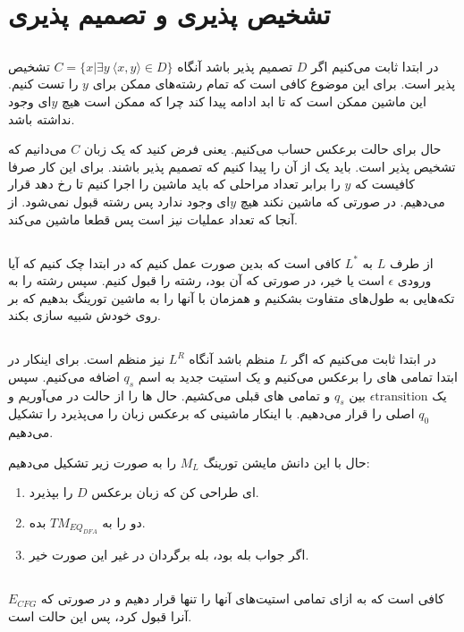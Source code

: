 \section{تشخيص پذيری و تصميم پذيری}
\subsection{}
در ابتدا ثابت می‌کنیم اگر
$D$
تصمیم پذیر باشد آنگاه
$C = \{x | \exists y ~ \langle x, y \rangle \in D\}$
تشخیص پذیر است. برای این موضوع کافی است که تمام رشته‌های ممکن برای
$y$
را تست کنیم. این ماشین ممکن است که تا ابد ادامه پیدا کند چرا که ممکن است هیچ
$y$ای وجود نداشته باشد.

حال برای حالت برعکس حساب می‌کنیم. یعنی فرض کنید که یک زبان
$C$
می‌دانیم که تشخیص پذیر است. باید یک
از آن را پیدا کنیم که تصمیم پذیر باشند. برای این کار صرفا کافیست که
$y$
را برابر تعداد مراحلی که باید ماشین را اجرا کنیم تا
رخ دهد قرار می‌دهیم. در صورتی که ماشین
نکند هیچ
$y$ای
وجود ندارد پس رشته قبول نمی‌شود. از آنجا که تعداد عملیات نیز
است پس قطعا ماشین
می‌کند.

\subsection{}
از طرف
$L$
به
$L^*$
کافی است که بدین صورت عمل کنیم که در ابتدا چک کنیم که آیا ورودی
$\epsilon$
است یا خیر، در صورتی که آن بود، رشته را قبول کنیم. سپس رشته را به تکه‌هایی به طول‌‌های متفاوت بشکنیم
و همزمان با
آنها را به ماشین تورینگ بدهیم که بر روی خودش شبیه سازی بکند.

\subsection{}
در ابتدا ثابت می‌کنیم که اگر
$L$
منظم باشد آنگاه
$L^R$
نیز منظم است. برای اینکار در ابتدا تمامی
های
را برعکس می‌کنیم و یک استیت جدید به اسم
$q_s$
اضافه می‌کنیم. سپس یک
$\epsilon \text{transition}$
بین
$q_s$
و تمامی
های
قبلی می‌کشیم. حال
ها
را از حالت
در می‌آوریم و
$q_0$
اصلی را
قرار می‌دهیم. با اینکار
ماشینی که برعکس زبان را می‌پذیرد را تشکیل می‌دهیم.

حال با این دانش مایشن تورینگ
$M_L$
را به صورت زیر تشکیل می‌دهیم:
\begin{enumerate}
    \item {}ای
    طراحی کن که زبان برعکس
    $D$
    را بپذیرد.
    \item دو  را به $TM_{EQ_{DFA}}$ بده.
    \item اگر جواب بله بود، بله برگردان در غیر این صورت خیر.
\end{enumerate}
\subsection{}
کافی است که به ازای تمامی استیت‌های
آنها را تنها
قرار دهیم و در صورتی که
$E_{CFG}$
آنرا قبول کرد، پس این حالت
است.